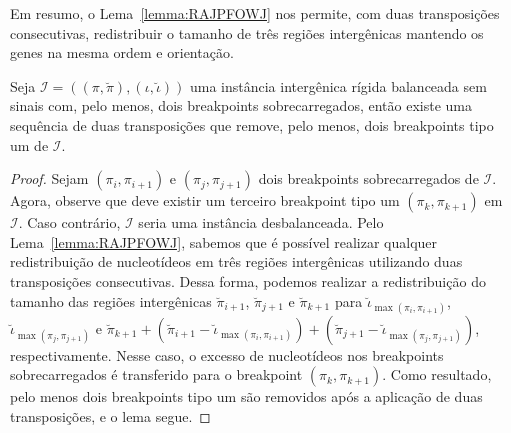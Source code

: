 Em resumo, o Lema~\ref{lemma:RAJPFOWJ} nos permite, com duas transposições consecutivas, redistribuir o tamanho de três regiões intergênicas mantendo os genes na mesma ordem e orientação.

\begin{lemma}\label{lemma:FSGHLWJU}
Seja $\mathcal{I} = ((\pi,\breve\pi),(\iota,\breve\iota))$ uma instância intergênica rígida balanceada sem sinais com, pelo menos, dois breakpoints sobrecarregados, então existe uma sequência de duas transposições que remove, pelo menos, dois breakpoints tipo um de $\mathcal{I}$.
\end{lemma}
\begin{proof}
Sejam $(\pi_i,\pi_{i+1})$ e $(\pi_j,\pi_{j+1})$ dois breakpoints sobrecarregados de $\mathcal{I}$.
Agora, observe que deve existir um terceiro breakpoint tipo um $(\pi_k,\pi_{k+1})$ em $\mathcal{I}$. Caso contrário, $\mathcal{I}$ seria uma instância desbalanceada. Pelo Lema~\ref{lemma:RAJPFOWJ}, sabemos que é possível realizar qualquer redistribuição de nucleotídeos em três regiões intergênicas utilizando duas transposições consecutivas. Dessa forma, podemos realizar a redistribuição do tamanho das regiões intergênicas $\breve\pi_{i+1}$, $\breve\pi_{j+1}$ e $\breve\pi_{k+1}$ para $\breve\iota_{\max(\pi_i,\pi_{i+1})}$, $\breve\iota_{\max(\pi_j,\pi_{j+1})}$ e $\breve\pi_{k+1} + (\breve\pi_{i+1} - \breve\iota_{\max(\pi_i,\pi_{i+1})}) + (\breve\pi_{j+1} - \breve\iota_{\max(\pi_j,\pi_{j+1})})$, respectivamente. Nesse caso, o excesso de nucleotídeos nos breakpoints sobrecarregados é transferido para o breakpoint $(\pi_k,\pi_{k+1})$. Como resultado, pelo menos dois breakpoints tipo um são removidos após a aplicação de duas transposições, e o lema segue.
\end{proof}

